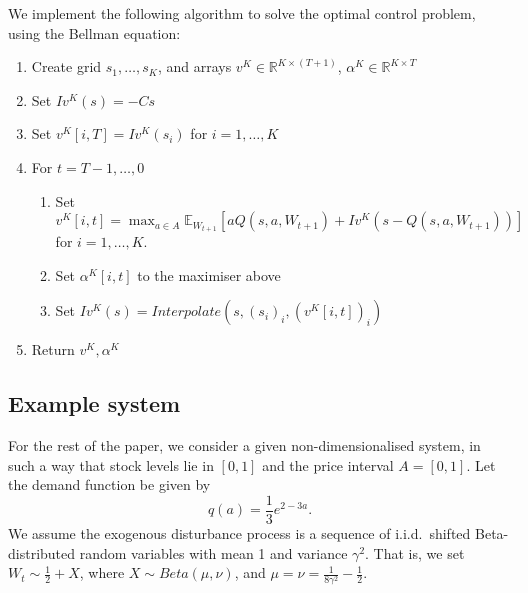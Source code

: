 \documentclass[main.tex]{subfiles}
\begin{document}
We implement the following algorithm to solve the optimal control
problem, using the Bellman equation:
\begin{enumerate}
\item Create grid $s_1,\dots,s_K$, and arrays $v^K\in\mathbb R^{K\times(T+1)}$,
  $\alpha^K\in\mathbb R^{K\times T}$
\item Set $Iv^K(s)=-Cs$
\item Set $v^K[i,T]=Iv^K(s_i)$ for $i=1,\dots, K$
\item For $t = T-1,\dots,0$
  \begin{enumerate}
  \item Set $\displaystyle v^K[i,t]=\max_{a\in A}\mathbb E_{W_{t+1}}\left[ aQ(s,a,W_{t+1})
      +Iv^K(s-Q(s,a,W_{t+1}))\right]$\\ for $i=1,\dots,K$.
  \item Set $\alpha^K[i,t]$ to the maximiser above
  \item Set $Iv^K(s) = Interpolate(s, {(s_i)}_i,{(v^K[i,t])}_i)$
  \end{enumerate}
\item Return $v^K,\alpha^K$
\end{enumerate}

\subsection{Example system}\label{sec:bellman_example_markdown}
For the rest of the paper, we consider a given non-dimensionalised
system, in such a way that stock levels lie in $[0,1]$ and the price
interval $A=[0,1]$.
Let the demand function be given by
\begin{equation}
  q(a)=\frac{1}{3}e^{2-3a}.
\end{equation}
We assume the exogenous disturbance process is a sequence of
i.i.d.~shifted Beta-distributed random variables with mean 1 and variance
$\gamma^2$. That is, we set $W_t\sim \frac{1}{2}+X$, where
$X\sim Beta(\mu,\nu)$, and
$\mu=\nu=\frac{1}{8\gamma^2}-\frac{1}{2}$.
\end{document}
